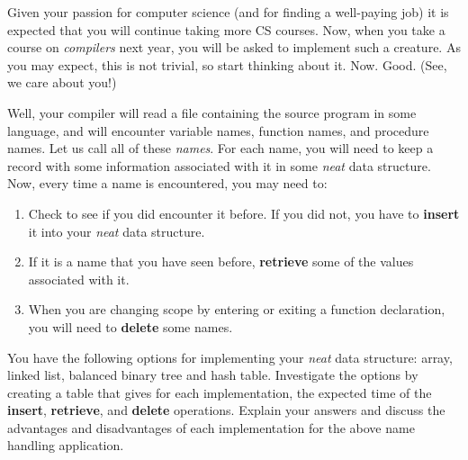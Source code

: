 Given your passion for computer science (and for finding a well-paying
job) it is expected that you will continue taking more CS courses.
Now, when you take a course on {\em compilers} next year, you will be
asked to implement such a creature.  As you may expect, this is not
trivial, so start thinking about it.  Now.  Good.  (See, we care about
you!)

Well, your compiler will read a file containing the source program in
some language, and will encounter variable names, function names, and
procedure names.  Let us call all of these {\em names}.  For each name,
you will need to keep a record with some information associated with it
in some {\em neat} data structure.  Now, every time a name is
encountered, you may need to:

\begin{enumerate}

	\item  Check to see if you did encounter it before. If you did
	not, you have to {\bf insert} it into your {\em neat} data
	structure.

	\item  If it is a name that you have seen before, {\bf retrieve}
	some of the values associated with it.

	\item  When you are changing scope by entering or exiting a
	function declaration, you will need to {\bf delete} some
	names.

\end{enumerate}

You have the following options for implementing your {\em neat} data
structure:  array, linked list, balanced binary tree and hash table.
Investigate the options by creating a table that gives for each
implementation, the expected time of the {\bf insert}, {\bf retrieve},
and {\bf delete} operations.  Explain your answers and discuss the
advantages and disadvantages of each implementation for the above name
handling application.
